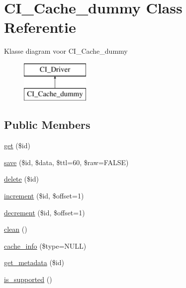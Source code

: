 \hypertarget{class_c_i___cache__dummy}{}\section{C\+I\+\_\+\+Cache\+\_\+dummy Class Referentie}
\label{class_c_i___cache__dummy}
Klasse diagram voor C\+I\+\_\+\+Cache\+\_\+dummy\begin{figure}[H]
\begin{center}
\leavevmode
\includegraphics[height=2.000000cm]{class_c_i___cache__dummy}
\end{center}
\end{figure}
\subsection*{Public Members}
\begin{DoxyCompactItemize}
\item 
\mbox{\hyperlink{class_c_i___cache__dummy_a50e3bfb586b2f42932a6a93f3fbb0828}{get}} (\$id)
\item 
\mbox{\hyperlink{class_c_i___cache__dummy_a472645db04a8ce4b040b789a3062a7d2}{save}} (\$id, \$data, \$ttl=60, \$raw=F\+A\+L\+SE)
\item 
\mbox{\hyperlink{class_c_i___cache__dummy_a2f8258add505482d7f00ea26493a5723}{delete}} (\$id)
\item 
\mbox{\hyperlink{class_c_i___cache__dummy_a2f07a4e09b57f4460d49852497d1808f}{increment}} (\$id, \$offset=1)
\item 
\mbox{\hyperlink{class_c_i___cache__dummy_a4eb1c2772c8efc48c411ea060dd040b7}{decrement}} (\$id, \$offset=1)
\item 
\mbox{\hyperlink{class_c_i___cache__dummy_adb40b812890a8bc058bf6b7a0e1a54d9}{clean}} ()
\item 
\mbox{\hyperlink{class_c_i___cache__dummy_aa8b9c4d9f0387156736ccd8850f0727e}{cache\+\_\+info}} (\$type=N\+U\+LL)
\item 
\mbox{\hyperlink{class_c_i___cache__dummy_a59635cf18e997c5141bffa05ff7622e0}{get\+\_\+metadata}} (\$id)
\item 
\mbox{\hyperlink{class_c_i___cache__dummy_a98c68fd153468bc148c4ed8c716859fc}{is\+\_\+supported}} ()
\end{DoxyCompactItemize}
